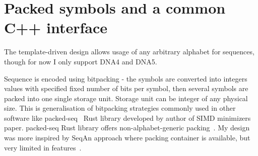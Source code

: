 \section{Packed symbols and a common C++ interface}
\label{sec:compact-sequence-range}
\label{sec:sequence-bit-layout}

The template-driven design allows usage of any arbitrary alphabet for sequences, though for now I only support DNA4 and DNA5.

Sequence is encoded using bitpacking - the symbols are converted into integers values with specified fixed number of bits per symbol, then several symbols are packed into one single storage unit. Storage unit can be integer of any physical size.
This is generalisation of bitpacking strategies commonly used in other software like packed-seq~\cite{packed_seq_library} Rust library developed by author of SIMD minimizers paper. packed-seq Rust library offers non-alphabet-generic packing~\cite{packed_seq_docs}.
My design was more inspired by SeqAn approach where packing container is available, but very limited in features~\cite{seqanManual}.

